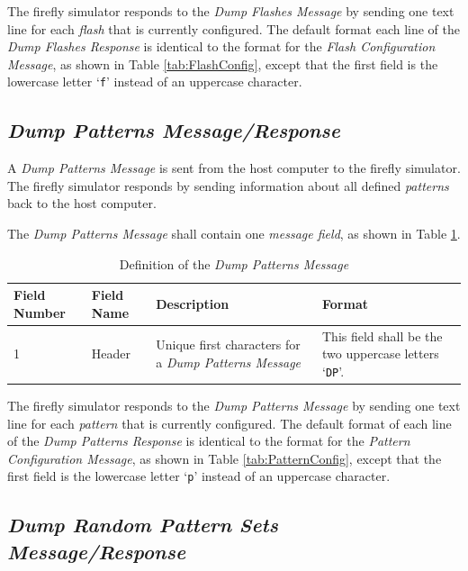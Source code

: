 \documentclass[letterpaper,11pt]{article}
\begin{document}
The firefly simulator responds to the \textit{Dump Flashes Message} by
sending one text line for each \textit{flash} that is currently configured.
The default format each line of the \textit{Dump Flashes Response} is identical
to the format for the \textit{Flash Configuration Message}, as shown in
Table \ref{tab:FlashConfig}, except that the first field is the lowercase
letter `\texttt{f}' instead of an uppercase character.

\subsection{\textit{Dump Patterns Message/Response}}

A \textit{Dump Patterns Message} is sent from the host computer to the
firefly simulator. The firefly simulator responds by sending information
about all defined \textit{patterns} back to the host computer.

The \textit{Dump Patterns Message} shall contain one \textit{message field},
as shown in Table \ref{tab:DumpPatterns}.

\begin{table}[H]
  \caption{Definition of the \textit{Dump Patterns Message}}
  \centering
  \setlength\extrarowheight{2pt}
  \begin{tabular}[h]{|p{0.5in}|p{1.00in}|p{2.25in}|p{2.25in}|} \hline
    Field Number & Field Name & Description & Format \\ \hline
    1            & Header
    & Unique first characters for a \textit{Dump Patterns Message}
    & This field shall be the two uppercase letters `\texttt{DP}'.
    \\ \hline
  \end{tabular}
  \label{tab:DumpPatterns}
\end{table}

The firefly simulator responds to the \textit{Dump Patterns Message} by
sending one text line for each \textit{pattern} that is currently configured.
The default format of each line of the \textit{Dump Patterns Response} is
identical to the format for the \textit{Pattern Configuration Message}, as
shown in Table \ref{tab:PatternConfig}, except that the first field is the
lowercase letter `\texttt{p}' instead of an uppercase character.

\subsection{\textit{Dump Random Pattern Sets Message/Response}}
\end{document}
